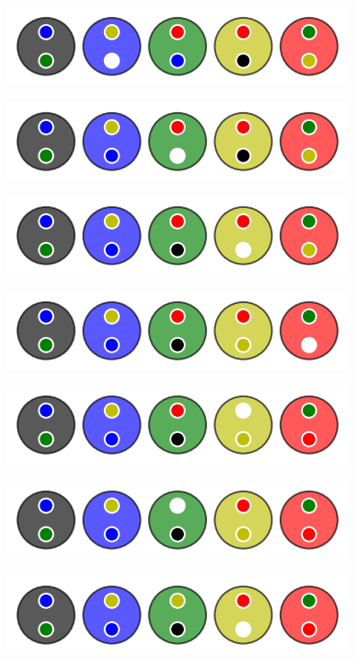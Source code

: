 \begin{multicols}{2}
    \begin{center}   %
        \includegraphics[scale= 0.45]{content/algo_selection/example/000.png}

        \includegraphics[scale= 0.45]{content/algo_selection/example/001.png}

        \includegraphics[scale= 0.45]{content/algo_selection/example/002.png}

        \includegraphics[scale= 0.45]{content/algo_selection/example/003.png}

        \includegraphics[scale= 0.45]{content/algo_selection/example/004.png}

        \includegraphics[scale= 0.45]{content/algo_selection/example/005.png}

        \includegraphics[scale= 0.45]{content/algo_selection/example/006.png}


\end{center}
\end{multicols}
